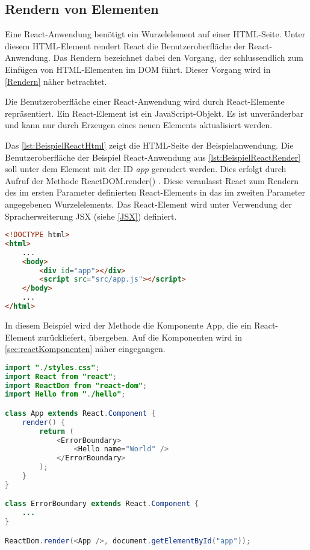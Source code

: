\subsection{Rendern von Elementen}

Eine React-Anwendung benötigt ein Wurzelelement auf einer HTML-Seite. Unter diesem HTML-Element rendert React die Benutzeroberfläche der React-Anwendung. Das Rendern bezeichnet dabei den Vorgang, der schlussendlich zum Einfügen von HTML-Elementen im DOM führt. Dieser Vorgang wird in \autoref{Rendern} näher betrachtet. 

Die Benutzeroberfläche einer React-Anwendung wird durch React-Elemente repräsentiert. Ein React-Element ist ein JavaScript-Objekt. Es ist unveränderbar und kann nur durch Erzeugen eines neuen Elements aktualisiert werden.

Das \autoref{lst:BeispielReactHtml} zeigt die HTML-Seite der Beispielanwendung. Die Benutzeroberfläche der Beispiel React-Anwendung aus \autoref{lst:BeispielReactRender} soll unter dem Element mit der ID \textit{app} gerendert werden. Dies erfolgt durch Aufruf der Methode \glqq ReactDOM.render() \grqq. Diese veranlasst React zum Rendern des im ersten Parameter definierten React-Elements in das im zweiten Parameter angegebenen Wurzelelements. Das React-Element wird unter Verwendung der Spracherweiterung JSX (siehe \autoref{JSX}) definiert.

\begin{lstlisting}[caption=Beispiel React-Anwendung: HTML-Datei , label=lst:BeispielReactHtml, language=HTML]
<!DOCTYPE html>
<html>
	...
	<body>
		<div id="app"></div>
		<script src="src/app.js"></script>
	</body>
	...
</html>
\end{lstlisting}

In diesem Beispiel wird der Methode die Komponente App, die ein React-Element zurückliefert, übergeben. Auf die Komponenten wird in \autoref{sec:reactKomponenten} näher eingegangen. \autocites[vgl.][4\psqq, 26\psqq]{Zeigermann.2016}[vgl.][]{Facebook.2018}[vgl.][]{Facebook.2018c}[vgl.][2\psqq]{Stefanov.2017}


\begin{lstlisting}[caption=Beispiel React-Anwendung: Aufruf der Render-Methode, label=lst:BeispielReactRender, language=Java]
import "./styles.css";
import React from "react";
import ReactDom from "react-dom";
import Hello from "./hello";

class App extends React.Component {
	render() {	
		return (
			<ErrorBoundary>
				<Hello name="World" />
			</ErrorBoundary>
		);
	}
}

class ErrorBoundary extends React.Component {
	...	
}

ReactDom.render(<App />, document.getElementById("app"));
\end{lstlisting}


